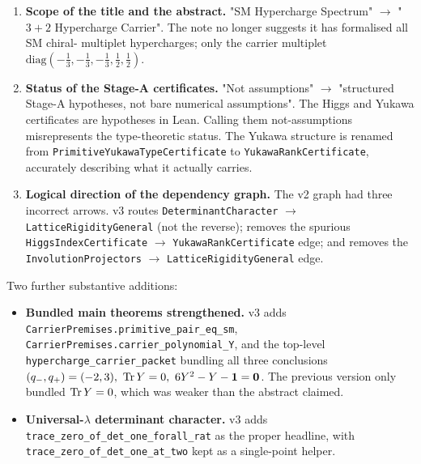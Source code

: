 \documentclass[11pt,a4paper]{article}
\begin{document}
\begin{enumerate}[leftmargin=1.6em, itemsep=3pt]
\item \textbf{Scope of the title and the abstract.} "SM
    Hypercharge Spectrum" $\to$ "$3+2$ Hypercharge Carrier". The
    note no longer suggests it has formalised all SM chiral-
    multiplet hypercharges; only the carrier multiplet
    $\mathrm{diag}(-\tfrac13,-\tfrac13,-\tfrac13,\tfrac12,\tfrac12)$.
\item \textbf{Status of the Stage-A certificates.} "Not
    assumptions" $\to$ "structured Stage-A hypotheses, not bare
    numerical assumptions". The Higgs and Yukawa certificates
    are hypotheses in Lean. Calling them not-assumptions
    misrepresents the type-theoretic status. The Yukawa
    structure is renamed from \texttt{PrimitiveYukawaTypeCertificate}
    to \texttt{YukawaRankCertificate}, accurately describing what
    it actually carries.
\item \textbf{Logical direction of the dependency graph.} The v2
    graph had three incorrect arrows. v3 routes
    \texttt{DeterminantCharacter} $\to$
    \texttt{LatticeRigidityGeneral} (not the reverse); removes
    the spurious \texttt{HiggsIndexCertificate} $\to$
    \texttt{YukawaRankCertificate} edge; and removes the
    \texttt{InvolutionProjectors} $\to$
    \texttt{LatticeRigidityGeneral} edge.
\end{enumerate}

Two further substantive additions:

\begin{itemize}[leftmargin=1.6em, itemsep=1pt]
\item \textbf{Bundled main theorems strengthened.} v3 adds
    \texttt{CarrierPremises.primitive\_pair\_eq\_sm},
    \texttt{CarrierPremises.carrier\_polynomial\_Y}, and the
    top-level \texttt{hypercharge\_carrier\_packet} bundling all
    three conclusions $(q_-,q_+)=(-2,3),\ \operatorname{Tr} Y=0,\
    6 Y^2 - Y - \mathbf 1 = \mathbf 0$. The previous version only
    bundled $\operatorname{Tr} Y = 0$, which was weaker than the abstract
    claimed.
\item \textbf{Universal-$\lambda$ determinant character.} v3 adds
    \texttt{trace\_zero\_of\_det\_one\_forall\_rat} as the proper
    headline, with \texttt{trace\_zero\_of\_det\_one\_at\_two} kept
    as a single-point helper.
\end{itemize}
\end{document}
